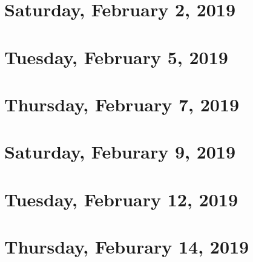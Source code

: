 \documentclass[reqno]{amsart}
\begin{document}
\section{Saturday, February 2, 2019}
    
    
\section{Tuesday, February 5, 2019}
    

\section{Thursday, February 7, 2019}
    

\section{Saturday, Feburary 9, 2019}
    
    
\section{Tuesday, February 12, 2019}
    

\section{Thursday, Feburary 14, 2019}
    
\end{document}
